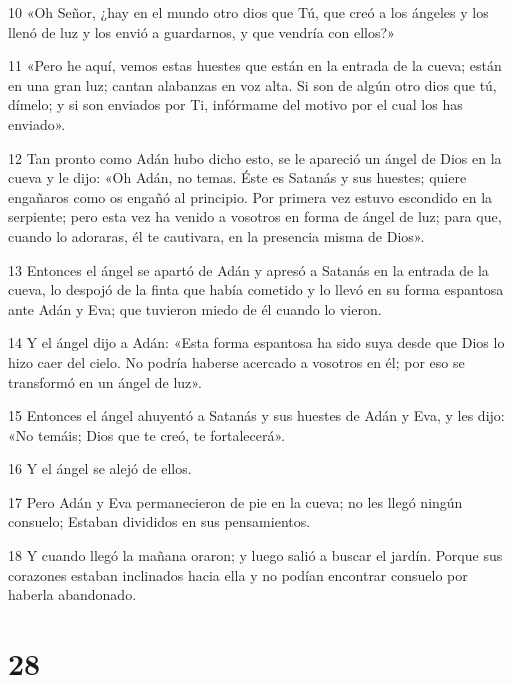 \par 10 «Oh Señor, ¿hay en el mundo otro dios que Tú, que creó a los ángeles y los llenó de luz y los envió a guardarnos, y que vendría con ellos?»

\par 11 «Pero he aquí, vemos estas huestes que están en la entrada de la cueva; están en una gran luz; cantan alabanzas en voz alta. Si son de algún otro dios que tú, dímelo; y si son enviados por Ti, infórmame del motivo por el cual los has enviado».

\par 12 Tan pronto como Adán hubo dicho esto, se le apareció un ángel de Dios en la cueva y le dijo: «Oh Adán, no temas. Éste es Satanás y sus huestes; quiere engañaros como os engañó al principio. Por primera vez estuvo escondido en la serpiente; pero esta vez ha venido a vosotros en forma de ángel de luz; para que, cuando lo adoraras, él te cautivara, en la presencia misma de Dios».

\par 13 Entonces el ángel se apartó de Adán y apresó a Satanás en la entrada de la cueva, lo despojó de la finta que había cometido y lo llevó en su forma espantosa ante Adán y Eva; que tuvieron miedo de él cuando lo vieron.

\par 14 Y el ángel dijo a Adán: «Esta forma espantosa ha sido suya desde que Dios lo hizo caer del cielo. No podría haberse acercado a vosotros en él; por eso se transformó en un ángel de luz».

\par 15 Entonces el ángel ahuyentó a Satanás y sus huestes de Adán y Eva, y les dijo: «No temáis; Dios que te creó, te fortalecerá».

\par 16 Y el ángel se alejó de ellos.

\par 17 Pero Adán y Eva permanecieron de pie en la cueva; no les llegó ningún consuelo; Estaban divididos en sus pensamientos.

\par 18 Y cuando llegó la mañana oraron; y luego salió a buscar el jardín. Porque sus corazones estaban inclinados hacia ella y no podían encontrar consuelo por haberla abandonado.

\chapter{28}


